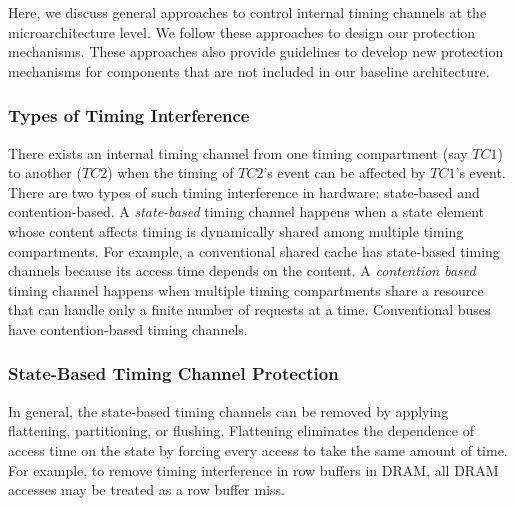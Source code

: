 Here, we discuss general approaches to control internal timing channels
at the microarchitecture level. We follow these approaches to design our
protection mechanisms. These approaches also provide guidelines to
develop new protection mechanisms for components that are not included in
our baseline architecture.

\subsubsection{Types of Timing Interference}

There exists an internal timing channel from one timing compartment (say $TC1$)
to another ($TC2$) when the timing of $TC2$'s event can be affected by $TC1$'s
event. There are two types of such timing interference in hardware: state-based
and contention-based.
A \emph{state-based} timing channel happens when a state element whose content
affects timing is dynamically shared among multiple timing compartments. 
For example, a conventional shared cache has state-based timing channels because 
its access time depends on the content.
A \emph{contention based} timing channel happens when multiple timing compartments
share a resource that can handle only a finite number of requests at a time.
Conventional buses have contention-based timing channels.


\subsubsection{State-Based Timing Channel Protection}

In general, the state-based 
timing channels can be removed by applying flattening, partitioning, or 
flushing.
Flattening eliminates the dependence of access time on the state by forcing 
every access to take the same amount of time. For example, to remove timing 
interference in row buffers in DRAM, all DRAM accesses may be treated as 
a row buffer miss.

